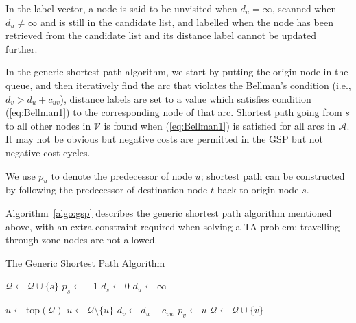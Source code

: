 In the label vector,
a node is said to be unvisited when $d_u = \infty$,
scanned when $d_u \neq \infty$ and is still in the candidate list,
and labelled when the node has been retrieved from the candidate list and its distance label cannot be updated further.

In the generic shortest path algorithm,
we start by putting the origin node in the queue,
and then iteratively find the arc that violates the Bellman's condition (i.e., $d_v > d_u + c_{uv}$),
distance labels are set to a value which satisfies condition (\ref{eq:Bellman1}) to the corresponding node of that arc.
Shortest path going from $s$ to all other nodes in $\mathcal{V}$ is found when (\ref{eq:Bellman1}) is satisfied for all arcs in $\mathcal{A}$.
It may not be obvious but negative costs are permitted in the GSP but not negative cost cycles.

We use $p_u$ to denote the predecessor of node $u$;
shortest path can be constructed by following the predecessor of destination node $t$ back to origin node $s$.


Algorithm~\ref{algo:gsp} describes the generic shortest path algorithm mentioned above,
with an extra constraint required when solving a TA problem: travelling through zone nodes are not allowed.
\begin{algorithm}
    \caption{The Generic Shortest Path Algorithm \citep{Klunder}}
    \label{algo:gsp}
    \begin{algorithmic}[1]
        \State $\mathcal{Q} \gets \mathcal{Q} \cup \{s\}$ 
        \State $p_s \gets -1$ 
        \State $d_s \gets 0$
         
        \State $d_u \gets \infty$
    \EndFor

    \State $ u \gets \text{top}(\mathcal{Q}) $ 
    \State $ u \gets \mathcal{Q} \setminus \{u\} $
     
    \State $d_v \gets d_u + c_{vw}$
    \State $p_v \gets u$
     
    \State $\mathcal{Q} \gets \mathcal{Q} \cup \{v\}$
\EndIf
                    \EndIf
                \EndFor
            \EndIf
        \EndWhile
    \EndProcedure
\end{algorithmic}
\end{algorithm}

